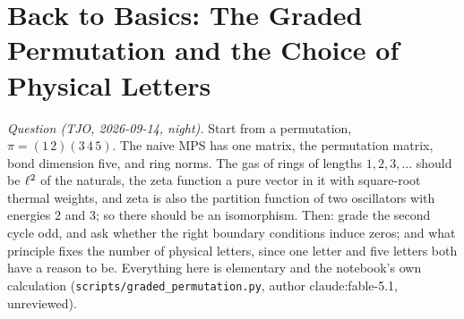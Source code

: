 
\section{Back to Basics: The Graded Permutation and the Choice of Physical Letters}
\label{sec:graded-permutation}

\emph{Question (TJO, 2026-09-14, night).} Start from a permutation, $\pi = (1\,2)(3\,4\,5)$. The
naive MPS has one matrix, the permutation matrix, bond dimension five, and ring norms. The gas of
rings of lengths $1,2,3,\dots$ should be $\ell^2$ of the naturals, the zeta function a pure vector
in it with square-root thermal weights, and zeta is also the partition function of two oscillators
with energies $2$ and $3$; so there should be an isomorphism. Then: grade the second cycle odd,
and ask whether the right boundary conditions induce zeros; and what principle fixes the number of
physical letters, since one letter and five letters both have a reason to be. Everything here is
elementary and the notebook's own calculation (\texttt{scripts/graded\_permutation.py}, author
claude:fable-5.1, unreviewed).

